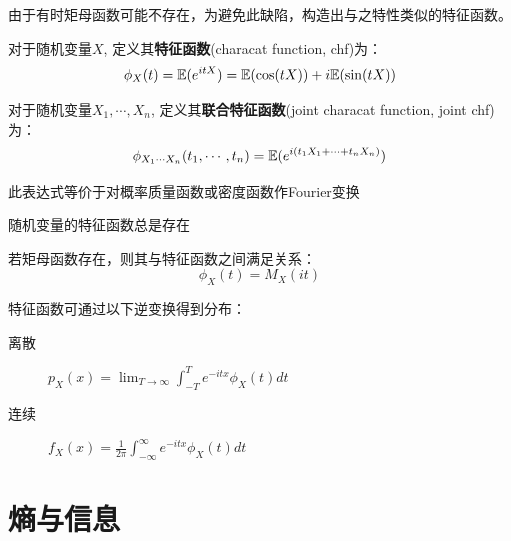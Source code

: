 由于有时矩母函数可能不存在，为避免此缺陷，构造出与之特性类似的特征函数。

\begin{definition}
    对于随机变量$X$, 定义其\textbf{特征函数}(characat function, chf)为：
    \[ \phi_X(t) = \mathbb{E}(e^{itX}) = \mathbb{E}(\cos (tX)) + i\mathbb{E}(\sin (tX))\]

    对于随机变量$X_1,\cdots, X_n$, 定义其\textbf{联合特征函数}(joint characat function, joint chf)为：
    \[ \phi_{X_1\cdots X_n}(t_1,\cdots ,t_n) = \mathbb{E}(e^{i (t_1 X_1+\cdots + t_n X_n)}) \]
\end{definition}

\begin{remark}
    此表达式等价于对概率质量函数或密度函数作Fourier变换
\end{remark}

\begin{proposition}
    随机变量的特征函数总是存在
\end{proposition}

\begin{proposition}
    若矩母函数存在，则其与特征函数之间满足关系：
    \[ \phi_X(t) = M_X(it) \]
\end{proposition}

\begin{theorem}
    特征函数可通过以下逆变换得到分布：
    \begin{description}
        \item[离散] $p_{X}(x)=\lim _{T \rightarrow \infty} \int_{-T}^{T} e^{-i t x} \phi_{X}(t) d t$
        \item[连续] $f_{X}(x)=\frac{1}{2 \pi} \int_{-\infty}^{\infty} e^{-i t x} \phi_{X}(t) d t$
    \end{description}
\end{theorem}



\section{熵与信息}
